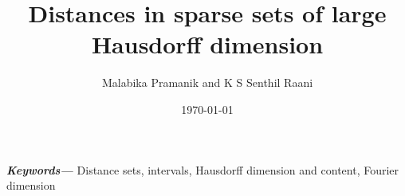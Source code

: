 \documentclass[a4paper,11pt]{amsart}
\numberwithin{equation}{section}
\providecommand{\keywords}[1]
{
  \small	
  \textbf{\textit{Keywords---}} #1
}
\begin{document}
\title{Distances in sparse sets of large Hausdorff dimension}

\author{Malabika Pramanik and K S Senthil Raani}  
\date{\today}
\keywords{Distance sets, intervals, Hausdorff dimension and content, Fourier dimension} 
\maketitle
\newcommand{\Addresses}{{%
  \bigskip
  \footnotesize

  M.~Pramanik, {\textsc{Department of Mathematics, 1984 Mathematics Road, University of British Columbia, Vancouver, Canada V6T 1Z2}} \par\nopagebreak
  \textit{E-mail address}: \texttt{malabika@math.ubc.ca}

\medskip

K S Senthil Raani, {\textsc{IISER Berhampur Transit campus (Govt.~ITI Building),
Engg.~School Junction, Berhampur, Odisha, India 760010. }} \par\nopagebreak
  \textit{E-mail address}: \texttt{raani@iiserbpr.ac.in}

}}
\end{document}
